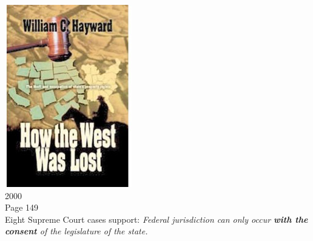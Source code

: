 \begin{frame}
    \begin{columns}[c]
            \centering
            \includegraphics[height=0.75\textheight]{img/htwwl.png} \\
            2000 \\
            Page 149 \\
            {\Large Eight Supreme Court cases support: \emph{Federal jurisdiction can only occur \textbf{{\color{red} with the consent}} of the legislature of the state. }}
    \end{columns}
\end{frame}

